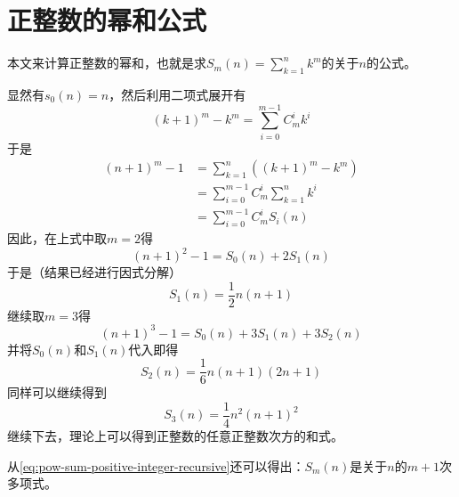 
\section{正整数的幂和公式}
\label{sec:power-sum-for-positive-integer}

本文来计算正整数的幂和，也就是求$S_m(n) = \sum_{k=1}^nk^m$的关于$n$的公式。

显然有$s_0(n)=n$，然后利用二项式展开有
\begin{equation*}
(k+1)^{m}-k^{m} = \sum_{i=0}^{m-1}C_{m}^{i}k^i
\end{equation*}
于是
\begin{equation}
\begin{split}
  \label{eq:pow-sum-positive-integer-recursive}
(n+1)^{m}-1 & = \sum_{k=1}^{n}\left( (k+1)^{m}-k^{m} \right) \\
& = \sum_{i=0}^{m-1}C_{m}^{i}\sum_{k=1}^{n}k^i \\
& = \sum_{i=0}^{m-1}C_{m}^{i}S_i(n)
\end{split}
\end{equation}
因此，在上式中取$m=2$得
\begin{equation*}
(n+1)^2-1 = S_0(n)+2S_1(n)
\end{equation*}
于是（结果已经进行因式分解）
\begin{equation*}
S_1(n)=\frac{1}{2}n(n+1)
\end{equation*}
继续取$m=3$得
\begin{equation*}
(n+1)^3-1=S_0(n)+3S_1(n)+3S_2(n)
\end{equation*}
并将$S_0(n)$和$S_1(n)$代入即得
\begin{equation*}
S_2(n) = \frac{1}{6}n(n+1)(2n+1)
\end{equation*}
同样可以继续得到
\begin{equation*}
S_3(n)=\frac{1}{4}n^2(n+1)^2
\end{equation*}
继续下去，理论上可以得到正整数的任意正整数次方的和式。

从\ref{eq:pow-sum-positive-integer-recursive}还可以得出：$S_m(n)$是关于$n$的$m+1$次多项式。


